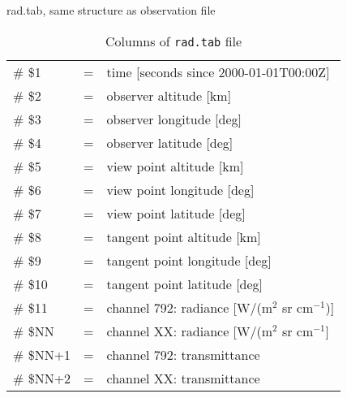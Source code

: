 rad.tab, same structure as observation file

\begin{table*}[!h]
\caption{Columns of \texttt{rad.tab} file}
\begin{tabular}{lcl}
\# \$1 & = & time [seconds since 2000-01-01T00:00Z] \\
\# \$2 & = & observer altitude [km] \\
\# \$3 & = & observer longitude [deg] \\
\# \$4 & = & observer latitude [deg] \\
\# \$5 & = & view point altitude [km] \\
\# \$6 & = & view point longitude [deg] \\
\# \$7 & = & view point latitude [deg] \\
\# \$8 & = & tangent point altitude [km] \\
\# \$9 & = & tangent point longitude [deg] \\
\# \$10 & = & tangent point latitude [deg] \\
\# \$11 & = & channel 792: radiance [W/(m$^2$ sr cm$^{-1}$)] \\
\# \$NN & = & channel XX: radiance [W/(m$^2$ sr cm$^{-1}$] \\
\# \$NN+1 & = & channel 792: transmittance \\
\# \$NN+2 & = & channel XX: transmittance \\
\end{tabular}
\end{table*} 
